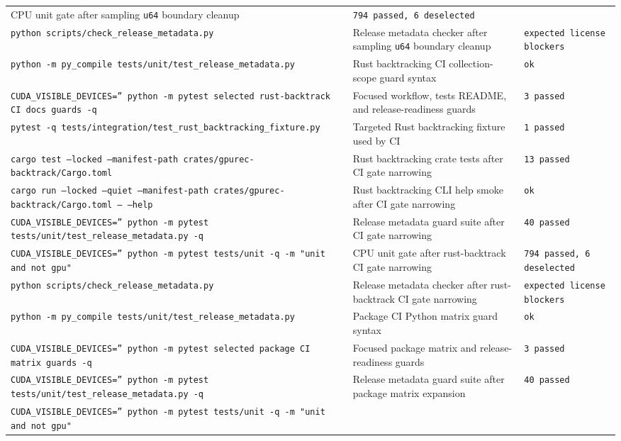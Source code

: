 \documentclass[11pt]{article}
\begin{document}
\begin{center}
\begin{tabular}{lll}
CPU unit gate after sampling \texttt{u64} boundary cleanup &
\texttt{794 passed, 6 deselected} \\
\texttt{python scripts/check\_release\_metadata.py} &
Release metadata checker after sampling \texttt{u64} boundary cleanup &
\texttt{expected license blockers} \\
\texttt{python -m py\_compile tests/unit/test\_release\_metadata.py} &
Rust backtracking CI collection-scope guard syntax &
\texttt{ok} \\
\texttt{CUDA\_VISIBLE\_DEVICES='' python -m pytest selected rust-backtrack CI docs guards -q} &
Focused workflow, tests README, and release-readiness guards &
\texttt{3 passed} \\
\texttt{pytest -q tests/integration/test\_rust\_backtracking\_fixture.py} &
Targeted Rust backtracking fixture used by CI &
\texttt{1 passed} \\
\texttt{cargo test --locked --manifest-path crates/gpurec-backtrack/Cargo.toml} &
Rust backtracking crate tests after CI gate narrowing &
\texttt{13 passed} \\
\texttt{cargo run --locked --quiet --manifest-path crates/gpurec-backtrack/Cargo.toml -- --help} &
Rust backtracking CLI help smoke after CI gate narrowing &
\texttt{ok} \\
\texttt{CUDA\_VISIBLE\_DEVICES='' python -m pytest tests/unit/test\_release\_metadata.py -q} &
Release metadata guard suite after CI gate narrowing &
\texttt{40 passed} \\
\texttt{CUDA\_VISIBLE\_DEVICES='' python -m pytest tests/unit -q -m "unit and not gpu"} &
CPU unit gate after rust-backtrack CI gate narrowing &
\texttt{794 passed, 6 deselected} \\
\texttt{python scripts/check\_release\_metadata.py} &
Release metadata checker after rust-backtrack CI gate narrowing &
\texttt{expected license blockers} \\
\texttt{python -m py\_compile tests/unit/test\_release\_metadata.py} &
Package CI Python matrix guard syntax &
\texttt{ok} \\
\texttt{CUDA\_VISIBLE\_DEVICES='' python -m pytest selected package CI matrix guards -q} &
Focused package matrix and release-readiness guards &
\texttt{3 passed} \\
\texttt{CUDA\_VISIBLE\_DEVICES='' python -m pytest tests/unit/test\_release\_metadata.py -q} &
Release metadata guard suite after package matrix expansion &
\texttt{40 passed} \\
\texttt{CUDA\_VISIBLE\_DEVICES='' python -m pytest tests/unit -q -m "unit and not gpu"} &

\end{tabular}
\end{center}
\end{document}
